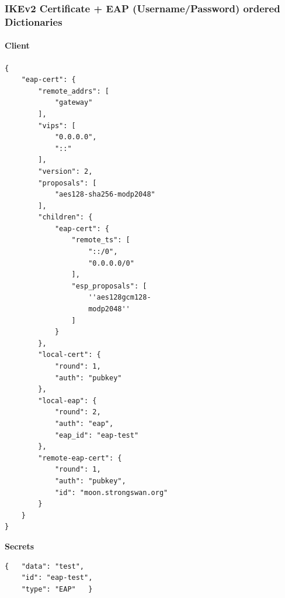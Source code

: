 \subsubsection{IKEv2 Certificate + EAP (Username/Password) ordered Dictionaries}
\noindent\begin{minipage}[t]{0.5\textwidth}
\vspace{0pt}
\paragraph{Client}\mbox{}\medskip
\begin{lstlisting}[style=BashInputStyle]
{
    "eap-cert": {
        "remote_addrs": [
            "gateway"
        ],
        "vips": [
            "0.0.0.0",
            "::"
        ],
        "version": 2,
        "proposals": [
            "aes128-sha256-modp2048"
        ],
        "children": {
            "eap-cert": {
                "remote_ts": [
                    "::/0",
                    "0.0.0.0/0"
                ],
                "esp_proposals": [
                    ''aes128gcm128-
                    modp2048''
                ]
            }
        },
        "local-cert": {
            "round": 1,
            "auth": "pubkey"
        },
        "local-eap": {
            "round": 2,
            "auth": "eap",
            "eap_id": "eap-test"
        },
        "remote-eap-cert": {
            "round": 1,
            "auth": "pubkey",
            "id": "moon.strongswan.org"
        }
    }
}
\end{lstlisting}
\hspace*{18pt}\textbf{Secrets}\mbox{}\medskip
\begin{lstlisting}[style=BashInputStyle]
{   "data": "test",
    "id": "eap-test",
    "type": "EAP"   }
\end{lstlisting}
\end{minipage}
\hfill
